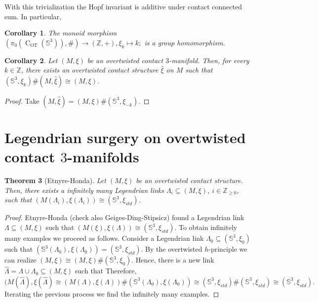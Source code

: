 \documentclass[11pt]{amsart}
\theoremstyle{plain}
\newtheorem{theorem}{Theorem}
\newtheorem{corollary}[theorem]{Corollary}
\theoremstyle{definition}
\theoremstyle{remark}
\numberwithin{theorem}{section}
\newcommand{\Z}{\mathbb{Z}}           %
\newcommand{\NS}{{\mathbb{S}}}
\newcommand{\C}{\operatorname{C}}
\newcommand{\OT}{\operatorname{OT}}
\begin{document}
With this trivialization the Hopf invariant is additive under contact connected sum. In particular, 

\begin{corollary}
    The monoid morphism $(\pi_0(\C_{\OT}(\NS^3)),\#)\rightarrow (\Z,+), \xi_k\mapsto k;$ is a group homomorphism. 
\end{corollary}

\begin{corollary}\label{cor:ConnectedSumOTSphere}
    Let $(M,\xi)$ be an overtwisted contact $3$-manifold. Then, for every $k\in \Z$, there exists an overtwisted contact structure $\hat{\xi}$ on $M$ such that $(\NS^3,\xi_k)\#(M,\hat{\xi})\cong (M,\xi)$.
\end{corollary}
\begin{proof}
    Take $(M,\hat{\xi})=(M,\xi)\#(\NS^3,\xi_{-k})$.
\end{proof}

\section{Legendrian surgery on overtwisted contact $3$-manifolds}

\begin{theorem}[Etnyre-Honda]\label{thm:OTLegendrianSurgery}
    Let $(M,\xi)$ be an overtwisted contact structure. Then, there exists a infinitely many Legendrian links $\Lambda_i\subseteq (M,\xi)$, $i\in \Z_{\geq 0}$, such that $(M(\Lambda_i),\xi(\Lambda_i))\cong (\NS^3,\xi_{std})$.
\end{theorem}
\begin{proof}
    Etnyre-Honda (check also Geiges-Ding-Stipsicz) found a Legendrian link $\Lambda\subseteq (M,\xi)$ such that $(M(\xi),\xi(\Lambda))\cong (\NS^3,\xi_{std})$. 
    To obtain infinitely many examples we proceed as follows. Consider a Legendrian link $\Lambda_0\subseteq (\NS^3,\xi_0)$ such that $(\NS^3(\Lambda_0),\xi(\Lambda_0))=(\NS^3,\xi_{std})$. By the overtwisted  $h$-principle we can realize $(M,\xi)\cong(M,\xi)\#(\NS^3,\xi_0)$. Hence, there is a new link $\hat{\Lambda}=\Lambda\cup \Lambda_0\subseteq (M,\xi)$ such that
   Therefore, $$(M(\hat{\Lambda}),\xi(\hat{\Lambda})\cong (M(\Lambda),\xi(\Lambda))\#(\NS^3(\Lambda_0),\xi(\Lambda_0))\cong (\NS^3,\xi_{std})\#(\NS^3,\xi_{std})\cong(\NS^3,\xi_{std}).$$
   Iterating the previous process we find the infinitely many examples. 
\end{proof}
\end{document}
